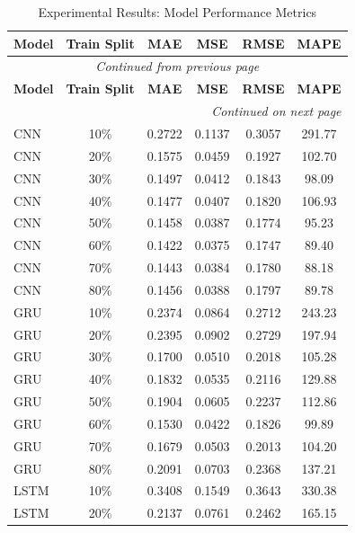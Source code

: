 
\begin{longtable}{l c c c c c}
    \toprule
    \textbf{Model} & \textbf{Train Split} & \textbf{MAE} & \textbf{MSE} & \textbf{RMSE} & \textbf{MAPE} \\
    \midrule
    \endfirsthead

    \multicolumn{6}{c}{{\textit{Continued from previous page}}} \\
    \toprule
    \textbf{Model} & \textbf{Train Split} & \textbf{MAE} & \textbf{MSE} & \textbf{RMSE} & \textbf{MAPE} \\
    \midrule
    \endhead

    \midrule \multicolumn{6}{r}{{\textit{Continued on next page}}} \\
    \endfoot

    \bottomrule
    \caption{Experimental Results: Model Performance Metrics}
    \label{tab:results_longtable}
    \endlastfoot
        CNN & 10\% & 0.2722 & 0.1137 & 0.3057 & 291.77 \\
        CNN & 20\% & 0.1575 & 0.0459 & 0.1927 & 102.70 \\
        CNN & 30\% & 0.1497 & 0.0412 & 0.1843 & 98.09 \\
        CNN & 40\% & 0.1477 & 0.0407 & 0.1820 & 106.93 \\
        CNN & 50\% & 0.1458 & 0.0387 & 0.1774 & 95.23 \\
        CNN & 60\% & 0.1422 & 0.0375 & 0.1747 & 89.40 \\
        CNN & 70\% & 0.1443 & 0.0384 & 0.1780 & 88.18 \\
        CNN & 80\% & 0.1456 & 0.0388 & 0.1797 & 89.78 \\
        GRU & 10\% & 0.2374 & 0.0864 & 0.2712 & 243.23 \\
        GRU & 20\% & 0.2395 & 0.0902 & 0.2729 & 197.94 \\
        GRU & 30\% & 0.1700 & 0.0510 & 0.2018 & 105.28 \\
        GRU & 40\% & 0.1832 & 0.0535 & 0.2116 & 129.88 \\
        GRU & 50\% & 0.1904 & 0.0605 & 0.2237 & 112.86 \\
        GRU & 60\% & 0.1530 & 0.0422 & 0.1826 & 99.89 \\
        GRU & 70\% & 0.1679 & 0.0503 & 0.2013 & 104.20 \\
        GRU & 80\% & 0.2091 & 0.0703 & 0.2368 & 137.21 \\
        LSTM & 10\% & 0.3408 & 0.1549 & 0.3643 & 330.38 \\
        LSTM & 20\% & 0.2137 & 0.0761 & 0.2462 & 165.15 \\

\end{longtable}
